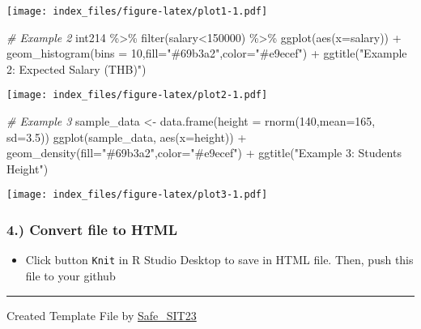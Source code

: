 \documentclass[
]{article}
\newenvironment{Shaded}{\begin{snugshade}}{\end{snugshade}}
\newcommand{\AttributeTok}[1]{\textcolor[rgb]{0.77,0.63,0.00}{#1}}
\newcommand{\CommentTok}[1]{\textcolor[rgb]{0.56,0.35,0.01}{\textit{#1}}}
\newcommand{\DecValTok}[1]{\textcolor[rgb]{0.00,0.00,0.81}{#1}}
\newcommand{\FloatTok}[1]{\textcolor[rgb]{0.00,0.00,0.81}{#1}}
\newcommand{\FunctionTok}[1]{\textcolor[rgb]{0.00,0.00,0.00}{#1}}
\newcommand{\NormalTok}[1]{#1}
\newcommand{\OtherTok}[1]{\textcolor[rgb]{0.56,0.35,0.01}{#1}}
\newcommand{\SpecialCharTok}[1]{\textcolor[rgb]{0.00,0.00,0.00}{#1}}
\newcommand{\StringTok}[1]{\textcolor[rgb]{0.31,0.60,0.02}{#1}}
\providecommand{\tightlist}{%
  \setlength{\itemsep}{0pt}\setlength{\parskip}{0pt}}
\begin{document}
\texttt{[image: index\_files/figure-latex/plot1-1.pdf]}

\begin{Shaded}
\begin{Highlighting}[]
\CommentTok{\# Example 2}
\NormalTok{int214 }\SpecialCharTok{\%\textgreater{}\%} \FunctionTok{filter}\NormalTok{(salary}\SpecialCharTok{\textless{}}\DecValTok{150000}\NormalTok{) }\SpecialCharTok{\%\textgreater{}\%} \FunctionTok{ggplot}\NormalTok{(}\FunctionTok{aes}\NormalTok{(}\AttributeTok{x=}\NormalTok{salary)) }\SpecialCharTok{+} \FunctionTok{geom\_histogram}\NormalTok{(}\AttributeTok{bins =} \DecValTok{10}\NormalTok{,}\AttributeTok{fill=}\StringTok{"\#69b3a2"}\NormalTok{,}\AttributeTok{color=}\StringTok{"\#e9ecef"}\NormalTok{) }\SpecialCharTok{+} \FunctionTok{ggtitle}\NormalTok{(}\StringTok{"Example 2: Expected Salary (THB)"}\NormalTok{)}
\end{Highlighting}
\end{Shaded}

\texttt{[image: index\_files/figure-latex/plot2-1.pdf]}

\begin{Shaded}
\begin{Highlighting}[]
\CommentTok{\# Example 3}
\NormalTok{sample\_data }\OtherTok{\textless{}{-}} \FunctionTok{data.frame}\NormalTok{(}\AttributeTok{height =} \FunctionTok{rnorm}\NormalTok{(}\DecValTok{140}\NormalTok{,}\AttributeTok{mean=}\DecValTok{165}\NormalTok{, }\AttributeTok{sd=}\FloatTok{3.5}\NormalTok{))}
\FunctionTok{ggplot}\NormalTok{(sample\_data, }\FunctionTok{aes}\NormalTok{(}\AttributeTok{x=}\NormalTok{height)) }\SpecialCharTok{+} \FunctionTok{geom\_density}\NormalTok{(}\AttributeTok{fill=}\StringTok{"\#69b3a2"}\NormalTok{,}\AttributeTok{color=}\StringTok{"\#e9ecef"}\NormalTok{) }\SpecialCharTok{+} 
  \FunctionTok{ggtitle}\NormalTok{(}\StringTok{"Example 3: Students Height"}\NormalTok{)}
\end{Highlighting}
\end{Shaded}

\texttt{[image: index\_files/figure-latex/plot3-1.pdf]}

\hypertarget{convert-file-to-html}{%
\subsubsection{4.) Convert file to HTML}\label{convert-file-to-html}}

\begin{itemize}
\tightlist
\item
  Click button \texttt{Knit} in R Studio Desktop to save in HTML file.
  Then, push this file to your github
\end{itemize}

\begin{center}\rule{0.5\linewidth}{0.5pt}\end{center}

Created Template File by
\href{https://github.com/safesit23}{Safe\_SIT23}
\end{document}
